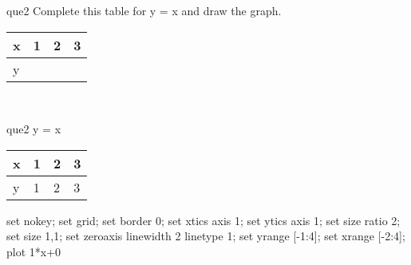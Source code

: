 \documentclass[13.5pt, varwidth=true]{beamer}
\begin{document}
\begin{frame}[shrink=19,fragile]
	\begin{beamercolorbox}[rounded=true, left, shadow=true,wd=14.8cm]{que2}
		 Complete this table for y = x and draw the graph. \\[0.3cm] \renewcommand{\arraystretch}{1.2}\begin{tabular}{|C|C|C|C|} \hline x & 1 & 2 & 3 \\ \hline y & & & \\ \hline \end{tabular}\\[0.3cm]
	\end{beamercolorbox}
\end{frame}
\begin{frame}[shrink=19,fragile]
	\begin{beamercolorbox}[rounded=true, left, shadow=true,wd=14.8cm]{que2}
		y = x\renewcommand{\arraystretch}{1.2}\begin{tabular}{|C|C|C|C|} \hline x & 1 & 2 & 3 \\ \hline y & 1 & 2 & 3\\ \hline \end{tabular}\begin{gnuplot}[terminal=pdf] set nokey; set grid; set border 0; set xtics axis 1; set ytics axis 1; set size ratio 2; set size 1,1; set zeroaxis linewidth 2 linetype 1; set yrange [-1:4]; set xrange [-2:4]; plot 1*x+0 \end{gnuplot}
	\end{beamercolorbox}
\end{frame}
\end{document}

